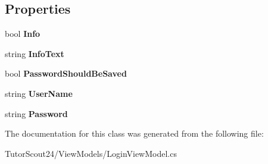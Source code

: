\subsection*{Properties}
\begin{DoxyCompactItemize}
\item 
\mbox{\label{class_tutor_scout24_1_1_view_models_1_1_login_view_model_a3a2a95601742d34cacf30713f77f706a}} 
bool {\bfseries Info}
\item 
\mbox{\label{class_tutor_scout24_1_1_view_models_1_1_login_view_model_a5ffb7d69f249ec881eca097add4d2a84}} 
string {\bfseries Info\+Text}
\item 
\mbox{\label{class_tutor_scout24_1_1_view_models_1_1_login_view_model_a270e44df6e6ad317c9a21048b3ad3aeb}} 
bool {\bfseries Password\+Should\+Be\+Saved}
\item 
\mbox{\label{class_tutor_scout24_1_1_view_models_1_1_login_view_model_adee8f64b22aad4f03c6bf8861c82f455}} 
string {\bfseries User\+Name}
\item 
\mbox{\label{class_tutor_scout24_1_1_view_models_1_1_login_view_model_afc34cd8397092d661673057c5493f460}} 
string {\bfseries Password}
\end{DoxyCompactItemize}


The documentation for this class was generated from the following file\+:\begin{DoxyCompactItemize}
\item 
Tutor\+Scout24/\+View\+Models/Login\+View\+Model.\+cs\end{DoxyCompactItemize}
